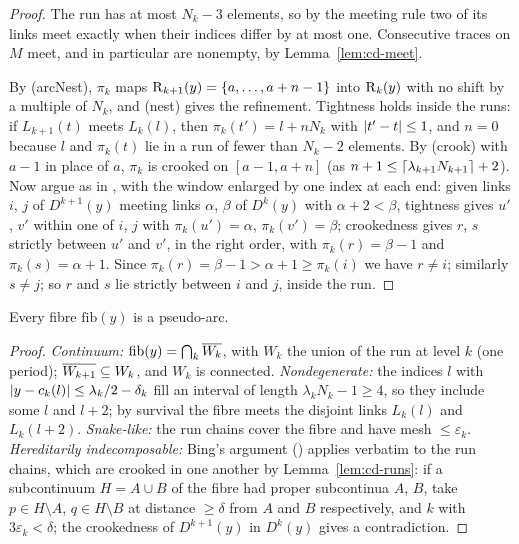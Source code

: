 \begin{proof}
The run has at most $N_k-3$ elements, so by the meeting rule two of its links meet exactly when their indices differ by at most one. Consecutive traces on $M$ meet, and in
particular are nonempty, by Lemma~\ref{lem:cd-meet}.

By (arcNest), $\pi_k$ maps $\operatorname{R}_{k+1}(y)=\left\{ a,\dots,a+n-1 \right\}$ into $\operatorname{R}_k(y)$ with no shift by a multiple of $N_k$, and (nest) gives the refinement. Tightness holds inside the runs: if
$L_{k+1}(t)$ meets $L_k(l)$, then $\pi_k(t')=l+nN_k$ with $\left\lvert t'-t\right\rvert\le1$, and $n=0$ because $l$ and $\pi_k(t)$ lie in a run of fewer than $N_k-2$ elements. By (crook) with $a-1$ in place of
$a$, $\pi_k$ is crooked on $[a-1,a+n]$ (as $n+1\le\left\lceil \lambda_{k+1}N_{k+1}\right\rceil+2$). Now argue as in , with the window enlarged by one index at each end: given links $i$, $j$ of $D^{k+1}(y)$ meeting links $\alpha$, $\beta$ of
$D^k(y)$ with $\alpha+2<\beta$, tightness gives $u'$, $v'$ within one of $i$, $j$ with $\pi_k(u')=\alpha$, $\pi_k(v')=\beta$; crookedness gives $r$, $s$ strictly between $u'$ and $v'$, in the
right order, with $\pi_k(r)=\beta-1$ and $\pi_k(s)=\alpha+1$. Since $\pi_k(r)=\beta-1>\alpha+1\ge\pi_k(i)$ we have $r\ne i$; similarly $s\ne j$; so $r$ and $s$ lie strictly between $i$ and
$j$, inside the run.
\end{proof}


\begin{proposition}\label{prop:cd-fibre-pa}
Every fibre $\mathrm{fib}(y)$ is a pseudo-arc.
\end{proposition}

\begin{proof}
\emph{Continuum:} $\mathrm{fib}(y)=\bigcap_k\overline{W_k}$, with $W_k$ the union of the run at level $k$ (one period); $\overline{W_{k+1}}\subseteq W_k$, and $W_k$ is connected.
\emph{Nondegenerate:} the indices $l$ with $\left\lvert y-c_k(l)\right\rvert\le\lambda_k/2-\delta_k$ fill an interval of length $\lambda_kN_k-1\ge4$, so they include some $l$ and $l+2$; by survival the fibre meets
the disjoint links $L_k(l)$ and $L_k(l+2)$. \emph{Snake-like:} the run chains cover the fibre and have mesh $\le\varepsilon_k$. \emph{Hereditarily indecomposable:} Bing's argument
() applies verbatim to the run chains, which are crooked in one another by Lemma~\ref{lem:cd-runs}: if a subcontinuum $H=A\cup B$ of the fibre had proper subcontinua
$A$, $B$, take $p\in H\setminus A$, $q\in H\setminus B$ at distance $\ge\delta$ from $A$ and $B$ respectively, and $k$ with $3\varepsilon_k<\delta$; the crookedness of $D^{k+1}(y)$ in $D^k(y)$
gives a contradiction.
\end{proof}

